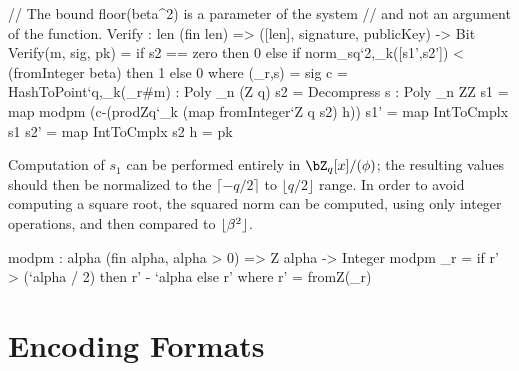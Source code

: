 
\begin{code}
  // The bound floor(beta^2) is a parameter of the system
  // and not an argument of the function.
  Verify : {len} (fin len) => ([len], signature, publicKey) -> Bit
  Verify(m, sig, pk) =
    if s2 == zero then
      0
    else if norm_sq`{2,_k}([s1',s2']) < (fromInteger beta) then
      1
    else
      0
    where
      (_r,s) = sig
      c = HashToPoint`{q,_k}(_r#m) : Poly _n (Z q)
      s2 = Decompress s : Poly _n ZZ
      s1 = map modpm (c-(prodZq`{_k} (map fromInteger`{Z q} s2) h))
      s1' = map IntToCmplx s1
      s2' = map IntToCmplx s2
      h = pk
\end{code}

Computation of $s_1$ can be performed entirely in $\bZ_q[x]/(\phi)$; the
resulting values should then be normalized to the $\lceil -q/2 \rceil$
to $\lfloor q/2 \rfloor$ range.
In order to avoid computing a square root, the squared norm can be computed, using only integer operations,
and then compared to $\lfloor \beta^2 \rfloor$.

\begin{code}
  modpm : {alpha} (fin alpha, alpha > 0) => Z alpha -> Integer
  modpm _r = if r' > (`alpha / 2) then r' - `alpha else r'
    where r' = fromZ(_r)
\end{code}



\section{Encoding Formats} \label{sec:spec:encode}

